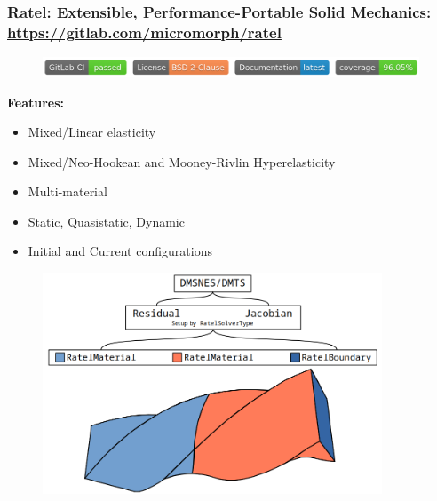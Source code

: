 \documentclass[aspectratio=169,xcolor=dvipsnames]{beamer}
\begin{document}
\begin{frame}
\frametitle{Ratel: Extensible, Performance-Portable Solid Mechanics: {\href{https://gitlab.com/micromorph/ratel}{https://gitlab.com/micromorph/ratel}}}

\begin{figure}[H]
\hspace{-3mm}
    \includegraphics[width=1\textwidth]{figures/ratel-badge.png}
\end{figure}

\begin{minipage}{0.45\textwidth}
    \alert{\textbf{Features:}}
      \begin{itemize}
          \item Mixed/Linear elasticity
          \item Mixed/Neo-Hookean and Mooney-Rivlin Hyperelasticity
          \item Multi-material
          \item Static, Quasistatic, Dynamic
          \item Initial and Current configurations
      \end{itemize}
\end{minipage}%
\begin{minipage}{0.55\textwidth}
    \begin{figure}
        \centering
        \includegraphics[width=0.9\textwidth]{figures/internal-api.png}
    \end{figure}
\end{minipage}

\end{frame}

\end{document}
